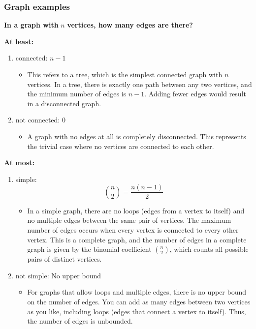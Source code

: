    \subsubsection{Graph examples}
    \begin{example}
        \textbf{In a graph with } $n$ \textbf{ vertices, how many edges are there?}

        \textbf{At least:}
        \begin{enumerate}
            \item connected: $n - 1$
            \begin{itemize}
                \item This refers to a tree, which is the simplest connected graph with $n$ vertices. In a tree, there is exactly one path between any two vertices, and the minimum number of edges is $n-1$. Adding fewer edges would result in a disconnected graph.
            \end{itemize}
            
            \item not connected: $0$
            \begin{itemize}
                \item A graph with no edges at all is completely disconnected. This represents the trivial case where no vertices are connected to each other.
            \end{itemize}
        \end{enumerate}

        \textbf{At most:}
        \begin{enumerate}
            \item simple: 
            \[
            \binom{n}{2} = \frac{n(n-1)}{2}
            \]
            \begin{itemize}
                \item In a simple graph, there are no loops (edges from a vertex to itself) and no multiple edges between the same pair of vertices. The maximum number of edges occurs when every vertex is connected to every other vertex. This is a complete graph, and the number of edges in a complete graph is given by the binomial coefficient $\binom{n}{2}$, which counts all possible pairs of distinct vertices.
            \end{itemize}
            
            \item not simple: No upper bound
            \begin{itemize}
                \item For graphs that allow loops and multiple edges, there is no upper bound on the number of edges. You can add as many edges between two vertices as you like, including loops (edges that connect a vertex to itself). Thus, the number of edges is unbounded.
            \end{itemize}
        \end{enumerate}


\end{example}
